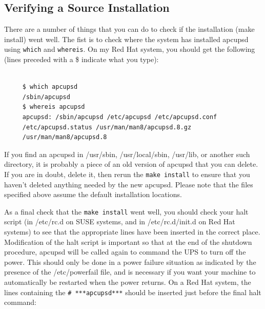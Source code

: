 \label{Verifying-a-Source-Installation}

\subsection*{Verifying a Source Installation}

\label{index-Verifying-Source-22}
\label{index-Installing_002c-Source-23}
There are a number of things that you can do to check if the installation
(make install) went well. The fist is to check where the system has installed
apcupsd using {\tt which} and {\tt whereis}. On my Red Hat system, you should
get the following (lines preceded with a \$ indicate what you type): 

\footnotesize
\begin{verbatim}
     
     $ which apcupsd
     /sbin/apcupsd
     $ whereis apcupsd
     apcupsd: /sbin/apcupsd /etc/apcupsd /etc/apcupsd.conf
     /etc/apcupsd.status /usr/man/man8/apcupsd.8.gz
     /usr/man/man8/apcupsd.8
\end{verbatim}
\normalsize

If you find an apcupsd in /usr/sbin, /usr/local/sbin, /usr/lib, or another
such directory, it is probably a piece of an old version of apcupsd that you
can delete. If you are in doubt, delete it, then rerun the {\tt make install}
to ensure that you haven't deleted anything needed by the new apcupsd.  Please
note that the files specified above assume the default installation locations.
 

As a final check that the {\tt make install} went well, you should check your
halt script (in /etc/rc.d on SUSE systems, and in /etc/rc.d/init.d on Red Hat
systems) to see that the appropriate lines have been inserted in the correct
place. Modification of the halt script is important so that at the end of the
shutdown procedure, apcupsd will be called again to command the UPS to turn
off the power. This should only be done in a power failure situation as
indicated by the presence of the /etc/powerfail file, and is necessary if you
want your machine to automatically be restarted when the power returns. On a
Red Hat system, the lines containing the {\tt \# ***apcupsd***} should be
inserted just before the final halt command: 

